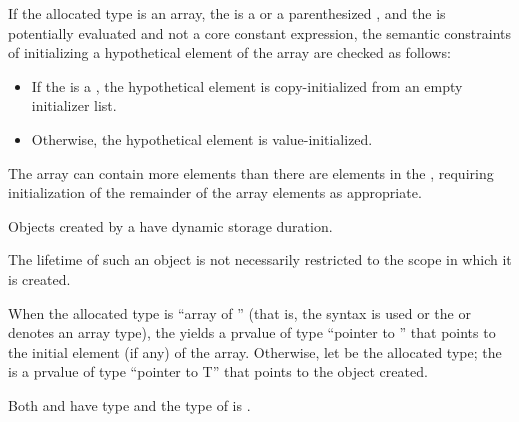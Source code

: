 \pnum
If the allocated type is an array,
the  is a 
or a parenthesized , and
the 
is potentially evaluated and not a core constant expression,
the semantic constraints of initializing a hypothetical element of
the array are checked as follows:
\begin{itemize}
\item
If the  is a ,
the hypothetical element is copy-initialized
from an empty initializer list.
\item
Otherwise, the hypothetical element is value-initialized.
\end{itemize}
\begin{note}
The array can contain more elements than there are
elements in the ,
requiring initialization of the remainder of the array elements as appropriate.
\end{note}

\pnum
{}%
Objects created by a  have dynamic storage
duration.
\begin{note}
%
The lifetime of such an object is not necessarily restricted to the
scope in which it is created.
\end{note}

\pnum
{}%
When the allocated type is ``array of  ''
(that is, the  syntax is used or the
 or  denotes an array type),
the  yields a prvalue of type ``pointer to ''
that points to the initial element (if any) of the array.
Otherwise, let  be the allocated type;
the 
is a prvalue of type ``pointer to T''
that points to the object created.
\begin{note}
Both  and  have type  and
the type of  is .
\end{note}

